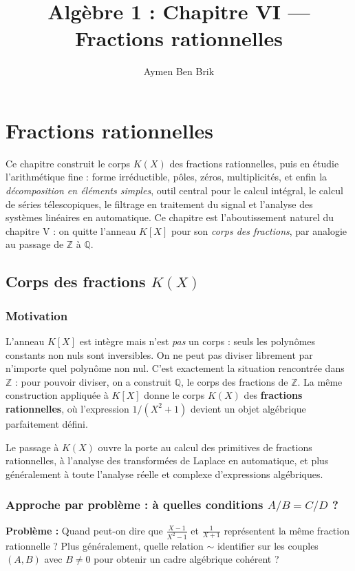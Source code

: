 \documentclass[12pt,a4paper]{report}
\title{Algèbre 1 : Chapitre VI --- Fractions rationnelles}
\author{Aymen Ben Brik}
\date{}
\theoremstyle{definition}
\theoremstyle{remark}
\begin{document}
\maketitle

\setcounter{chapter}{5}
\chapter{Fractions rationnelles}

Ce chapitre construit le corps $K(X)$ des fractions rationnelles, puis en étudie l'arithmétique fine : forme irréductible, pôles, zéros, multiplicités, et enfin la \emph{décomposition en éléments simples}, outil central pour le calcul intégral, le calcul de séries télescopiques, le filtrage en traitement du signal et l'analyse des systèmes linéaires en automatique. Ce chapitre est l'aboutissement naturel du chapitre V : on quitte l'anneau $K[X]$ pour son \emph{corps des fractions}, par analogie au passage de $\mathbb{Z}$ à $\mathbb{Q}$.

\section{Corps des fractions $K(X)$}

\subsection{Motivation}
L'anneau $K[X]$ est intègre mais n'est \emph{pas} un corps : seuls les polynômes constants non nuls sont inversibles. On ne peut pas diviser librement par n'importe quel polynôme non nul. C'est exactement la situation rencontrée dans $\mathbb{Z}$ : pour pouvoir diviser, on a construit $\mathbb{Q}$, le corps des fractions de $\mathbb{Z}$. La même construction appliquée à $K[X]$ donne le corps $K(X)$ des \textbf{fractions rationnelles}, où l'expression $1/(X^2 + 1)$ devient un objet algébrique parfaitement défini.

Le passage à $K(X)$ ouvre la porte au calcul des primitives de fractions rationnelles, à l'analyse des transformées de Laplace en automatique, et plus généralement à toute l'analyse réelle et complexe d'expressions algébriques.

\subsection{Approche par problème : à quelles conditions $A/B = C/D$ ?}
\textbf{Problème :} Quand peut-on dire que $\frac{X - 1}{X^2 - 1}$ et $\frac{1}{X + 1}$ représentent la même fraction rationnelle ? Plus généralement, quelle relation $\sim$ identifier sur les couples $(A, B)$ avec $B \neq 0$ pour obtenir un cadre algébrique cohérent ?
\end{document}
